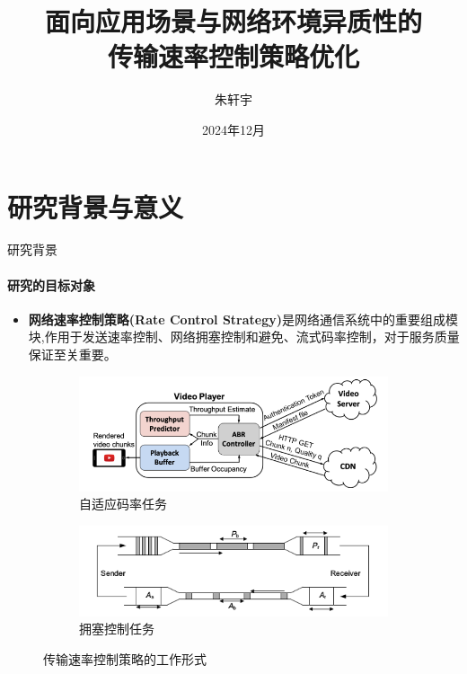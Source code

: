 \documentclass{beamer}
\title{面向应用场景与网络环境异质性的\\传输速率控制策略优化}
\author{朱轩宇}
\date{2024年12月}
\begin{document}
\maketitle

\section{研究背景与意义}
\begin{frame}[fragile]{研究背景}
    \framesubtitle{研究的目标对象}
        \begin{itemize}
            \item \textbf{网络速率控制策略(Rate Control Strategy)}是网络通信系统中的重要组成模块,作用于发送速率控制、网络拥塞控制和避免、流式码率控制，对于服务质量保证至关重要。
        \end{itemize}
                \begin{figure}[ht]
                \centering
                \begin{subfigure}{0.49\textwidth}
                    \centering
                    \includegraphics[width=\textwidth]{figures/chap02/abrteaser.png} 
                    \caption{自适应码率任务\cite{mao2017neural}}
                \end{subfigure}%
                \hfill
                \begin{subfigure}{0.49\textwidth}
                    \centering
                    \includegraphics[width=\textwidth]{figures/chap02/sending.png} 
                    \caption{拥塞控制任务\cite{author2024performance}}
                \end{subfigure}
                \vspace{-1em}
                \caption{传输速率控制策略的工作形式}

            \end{figure}
            
\end{frame}
\end{document}
